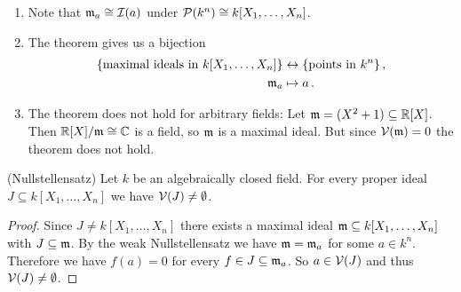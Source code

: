 \begin{rem}
  \begin{enumerate}[label=\emph{\alph*)},leftmargin=*]
    \item
      Note that $\mathfrak{m}_{a} \cong \mathcal{I}(a)$ under $\mathcal{P}(k^n) \cong k[X_1, \dotsc, X_n]$.
    \item
      The theorem gives us a bijection
      \begin{align*}
                          \{\text{maximal ideals in $k[X_1, \dotsc, X_n]$}\}
        &\leftrightarrow  \{\text{points in $k^n$}\} \,,  \\
                          \mathfrak{m}_a
        &\mapsto          a \,.
      \end{align*}
    \item
      The theorem does not hold for arbitrary fields:
      Let \mbox{$\mathfrak{m} = (X^2 + 1) \subseteq \mathbb{R}[X]$}.
      Then $\mathbb{R}[X]/\mathfrak{m} \cong \mathbb{C}$ is a field, so $\mathfrak{m}$ is a maximal ideal.
      But since $\mathcal{V}(\mathfrak{m}) = 0$ the theorem does not hold.
  \end{enumerate}
\end{rem}


\begin{cor}(Nullstellensatz)
  Let $k$ be an algebraically closed field.
  For every proper ideal $J \subseteq k[X_1, \dotsc, X_n]$ we have $\mathcal{V}(J) \neq \emptyset$.
\end{cor}
\begin{proof}
  Since $J \neq k[X_1, \dotsc, X_n]$ there exists a maximal ideal $\mathfrak{m} \subseteq k[X_1, \dotsc, X_n]$ with $J \subseteq \mathfrak{m}$.
  By the weak Nullstellensatz we have $\mathfrak{m} = \mathfrak{m}_a$ for some $a \in k^n$.
  Therefore we have $f(a) = 0$ for every $f \in J \subseteq \mathfrak{m}_a$.
  So $a \in \mathcal{V}(J)$ and thus $\mathcal{V}(J) \neq \emptyset$.
\end{proof}


